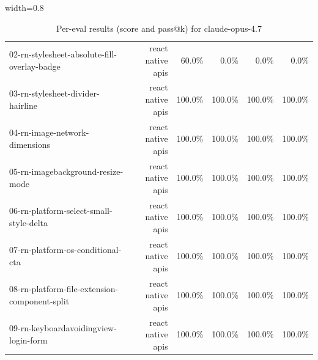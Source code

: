 \begin{table}[htbp]
\begin{adjustbox}{width=0.8\textwidth}
\begin{tabular}{lrrrrr}
02-rn-stylesheet-absolute-fill-overlay-badge & react native apis & 60.0\% & 0.0\% & 0.0\% & 0.0\% \\
03-rn-stylesheet-divider-hairline & react native apis & 100.0\% & 100.0\% & 100.0\% & 100.0\% \\
04-rn-image-network-dimensions & react native apis & 100.0\% & 100.0\% & 100.0\% & 100.0\% \\
05-rn-imagebackground-resize-mode & react native apis & 100.0\% & 100.0\% & 100.0\% & 100.0\% \\
06-rn-platform-select-small-style-delta & react native apis & 100.0\% & 100.0\% & 100.0\% & 100.0\% \\
07-rn-platform-os-conditional-cta & react native apis & 100.0\% & 100.0\% & 100.0\% & 100.0\% \\
08-rn-platform-file-extension-component-split & react native apis & 100.0\% & 100.0\% & 100.0\% & 100.0\% \\
09-rn-keyboardavoidingview-login-form & react native apis & 100.0\% & 100.0\% & 100.0\% & 100.0\% \\
\bottomrule
\end{tabular}
\end{adjustbox}
\caption{Per-eval results (score and pass@k) for claude-opus-4.7}
\end{table}
